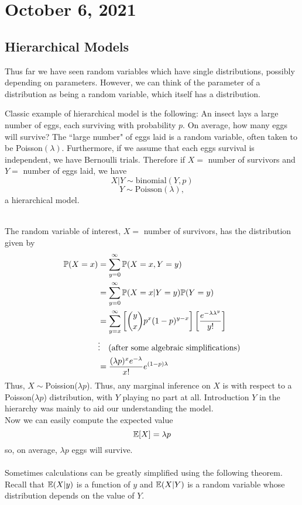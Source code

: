 \section{October 6, 2021}
\subsection{Hierarchical Models}
Thus far we have seen random variables which have single distributions, possibly depending on parameters. However, we can think of the parameter of a distribution as being a random variable, which itself has a distribution. 

\begin{example}
Classic example of  hierarchical model is the following: An insect lays a large number of eggs, each surviving with probability $p$. On average, how many eggs will survive? 
The ``large number" of eggs laid is a random variable, often taken to be Poisson$(\lambda)$. Furthermore, if we assume that each eggs survival is independent, we have Bernoulli trials. Therefore if $X =$ number of survivors and $Y=$ number of eggs laid, we have
$$
X|Y \sim \text{binomial}(Y,p)
$$
$$
Y \sim \text{Poisson}(\lambda),
$$
a hierarchical model.
\end{example}
\\
The random variable of interest, $X =$ number of survivors, has the distribution given by
\begin{align*}
    \mathbb P(X=x) &= \sum_{y=0}^{\infty} \mathbb P(X=x,Y=y) \\
             &= \sum_{y=0}^{\infty} \mathbb P(X=x|Y=y) \mathbb P(Y=y) \\
             &= \sum_{y=x}^{\infty} \left[\binom{y}{x}p^x(1-p)^{y-x} \right] \left[ \frac{e^{-\lambda \lambda^y}}{y!} \right] \\
             & \vdots \quad \text{(after some algebraic simplifications)} \\ 
             &= \frac{(\lambda p)^x e^{- \lambda}}{x!} e^{(1-p) \lambda}
\end{align*}
Thus, $X \sim$Poission($\lambda p$). Thus, any marginal inference on $X$ is with respect to a Poisson($\lambda p$) distribution, with $Y$ playing no part at all. Introduction $Y$ in the hierarchy was mainly to aid our understanding the model. 
\\
Now we can easily compute the expected value
$$
\mathbb E[X]= \lambda p
$$
so, on average, $\lambda p$ eggs will survive. 
\\
\\
Sometimes calculations can be greatly simplified using the following theorem. Recall that $\mathbb E(X|y)$ is a function of $y$ and $\mathbb E(X|Y)$ is a random variable whose distribution depends on the value of $Y$.


